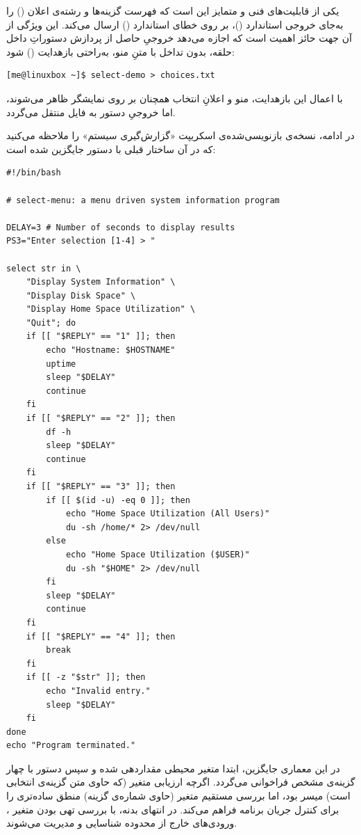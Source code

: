 یکی از قابلیت‌های فنی و متمایز  این است که فهرست گزینه‌ها و رشته‌ی اعلان () را به‌جای خروجی استاندارد ()، بر روی خطای استاندارد () ارسال می‌کند. این ویژگی از آن جهت حائز اهمیت است که اجازه می‌دهد خروجیِ حاصل از پردازش دستوراتِ داخل حلقه، بدون تداخل با متنِ منو، به‌راحتی بازهدایت () شود:

\begin{latin}
\begin{lstlisting}
[me@linuxbox ~]$ select-demo > choices.txt
\end{lstlisting}
\end{latin}

با اعمال این بازهدایت، منو و اعلانِ انتخاب همچنان بر روی نمایشگر ظاهر می‌شوند، اما خروجیِ دستور  به فایل  منتقل می‌گردد.

در ادامه، نسخه‌ی بازنویسی‌شده‌ی اسکریپت «گزارش‌گیری سیستم» را ملاحظه می‌کنید که در آن ساختار قبلی با دستور  جایگزین شده است:

\begin{latin}
\begin{lstlisting}
#!/bin/bash

# select-menu: a menu driven system information program

DELAY=3 # Number of seconds to display results
PS3="Enter selection [1-4] > "

select str in \
    "Display System Information" \
    "Display Disk Space" \
    "Display Home Space Utilization" \
    "Quit"; do
    if [[ "$REPLY" == "1" ]]; then
        echo "Hostname: $HOSTNAME"
        uptime
        sleep "$DELAY"
        continue
    fi
    if [[ "$REPLY" == "2" ]]; then
        df -h
        sleep "$DELAY"
        continue
    fi
    if [[ "$REPLY" == "3" ]]; then
        if [[ $(id -u) -eq 0 ]]; then
            echo "Home Space Utilization (All Users)"
            du -sh /home/* 2> /dev/null
        else
            echo "Home Space Utilization ($USER)"
            du -sh "$HOME" 2> /dev/null
        fi
        sleep "$DELAY"
        continue
    fi
    if [[ "$REPLY" == "4" ]]; then
        break
    fi
    if [[ -z "$str" ]]; then
        echo "Invalid entry."
        sleep "$DELAY"
    fi
done
echo "Program terminated."
\end{lstlisting}
\end{latin}

در این معماری جایگزین، ابتدا متغیر محیطی  مقداردهی شده و سپس دستور  با چهار گزینه‌ی مشخص فراخوانی می‌گردد. اگرچه ارزیابی متغیر  (که حاوی متن گزینه‌ی انتخابی است) میسر بود، اما بررسی مستقیم متغیر  (حاوی شماره‌ی گزینه) منطق ساده‌تری را برای کنترل جریان برنامه فراهم می‌کند. در انتهای بدنه، با بررسی تهی بودن متغیر ، ورودی‌های خارج از محدوده شناسایی و مدیریت می‌شوند.

